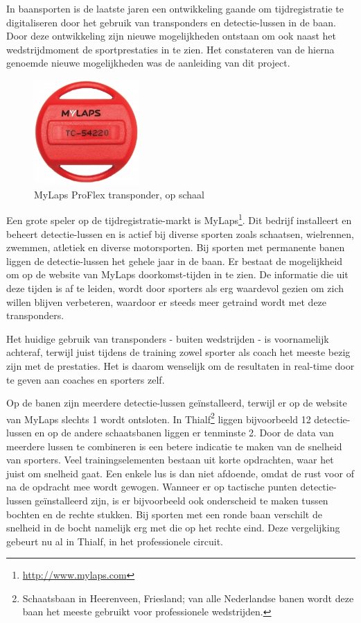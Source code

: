 In baansporten is de laatste jaren een ontwikkeling gaande om tijdregistratie te digitaliseren door het gebruik van transponders en detectie-lussen in de baan. Door deze ontwikkeling zijn nieuwe mogelijkheden ontstaan om ook naast het wedstrijdmoment de sportprestaties in te zien. Het constateren van de hierna genoemde nieuwe mogelijkheden was de aanleiding van dit project.

\begin{figure}
  \begin{center}
    \includegraphics[width=4cm]{style/images/transponder}
  \end{center}
  \caption{MyLaps ProFlex transponder, op schaal} 
\end{figure}
Een grote speler op de tijdregistratie-markt is MyLaps\footnote{\url{http://www.mylaps.com}}. Dit bedrijf installeert en beheert detectie-lussen en is actief bij diverse sporten zoals schaatsen, wielrennen, zwemmen, atletiek en diverse motorsporten. Bij sporten met permanente banen liggen de detectie-lussen het gehele jaar in de baan. Er bestaat de mogelijkheid om op de website van MyLaps doorkomst-tijden in te zien. De informatie die uit deze tijden is af te leiden, wordt door sporters als erg waardevol gezien om zich willen blijven verbeteren, waardoor er steeds meer getraind wordt met deze transponders.

Het huidige gebruik van transponders - buiten wedstrijden - is voornamelijk achteraf, terwijl juist tijdens de training zowel sporter als coach het meeste bezig zijn met de prestaties. Het is daarom wenselijk om de resultaten in real-time door te geven aan coaches en sporters zelf.

Op de banen zijn meerdere detectie-lussen geïnstalleerd, terwijl er op de website van MyLaps slechts 1 wordt ontsloten. In Thialf\footnote{Schaatsbaan in Heerenveen, Friesland; van alle Nederlandse banen wordt deze baan het meeste gebruikt voor professionele wedstrijden.} liggen bijvoorbeeld 12 detectie-lussen en op de andere schaatsbanen liggen er tenminste 2. Door de data van meerdere lussen te combineren is een betere indicatie te maken van de snelheid van sporters. Veel trainingselementen bestaan uit korte opdrachten, waar het juist om snelheid gaat. Een enkele lus is dan niet afdoende, omdat de rust voor of na de opdracht mee wordt gewogen. Wanneer er op tactische punten detectie-lussen geïnstalleerd zijn, is er bijvoorbeeld ook onderscheid te maken tussen bochten en de rechte stukken. Bij sporten met een ronde baan verschilt de snelheid in de bocht namelijk erg met die op het rechte eind. Deze vergelijking gebeurt nu al in Thialf, in het professionele circuit.

